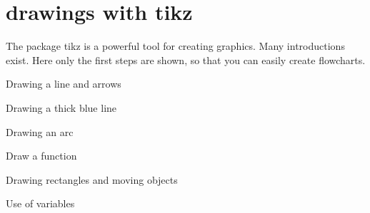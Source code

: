 
%
%

\chapter{drawings with tikz}


The package tikz is a powerful tool for creating graphics. Many introductions exist. Here only the first steps are shown, so that you can easily create flowcharts.

\bigskip

Drawing a line and arrows



\medskip



\bigskip

Drawing a thick blue line



\medskip



\bigskip

Drawing an arc



\medskip



\bigskip

Draw a function



\medskip



\bigskip

Drawing rectangles and moving objects



\medskip



\bigskip


\bigskip

Use of variables



\medskip



